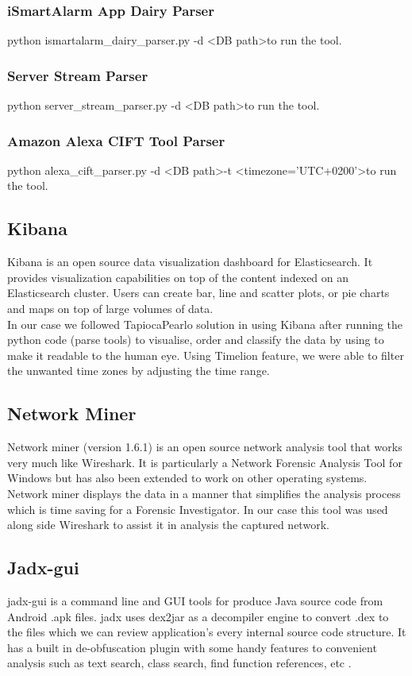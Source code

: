 \documentclass{easychair}
\begin{document}
\subsubsection{iSmartAlarm App Dairy Parser}
python ismartalarm\_dairy\_parser.py -d \textless DB path\textgreater to run the tool.
\subsubsection{Server Stream Parser}
python server\_stream\_parser.py -d \textless DB path\textgreater to run the tool.
\subsubsection{Amazon Alexa CIFT Tool Parser}
python alexa\_cift\_parser.py -d \textless DB path\textgreater -t \textless timezone=’UTC+0200’\textgreater to run the tool.

\subsection{Kibana}
Kibana is an open source data visualization dashboard for Elasticsearch. It provides visualization capabilities on top of the content indexed on an Elasticsearch cluster. Users can create bar, line and scatter plots, or pie charts and maps on top of large volumes of data. \cite{Ali_4} \cite{Ali_5} \\ In our case we followed TapiocaPearlo solution in using Kibana after running the python code (parse tools) to visualise, order and classify the data by using to make it readable to the human eye. Using Timelion feature, we were able to filter the unwanted time zones by adjusting the time range. 

\subsection{Network Miner}
Network miner (version 1.6.1) is an open source network analysis tool that works very much like Wireshark. It is particularly a Network Forensic Analysis Tool for Windows but has also been extended to work on other operating systems. Network miner displays the data in a manner that simplifies the analysis process which is time saving for a Forensic Investigator. In our case this tool was used along side Wireshark to assist it in analysis the captured network.

\subsection{Jadx-gui}
jadx-gui is a command line and GUI tools for produce Java source code from Android .apk files. jadx uses dex2jar as a decompiler engine to convert .dex to the  files  which we can review application’s every internal source code structure. It has a built in de-obfuscation plugin with some handy features to convenient analysis such as text search, class search, find function references, etc \cite{Gh_1}  \cite{Gh_2}. 
\end{document}
